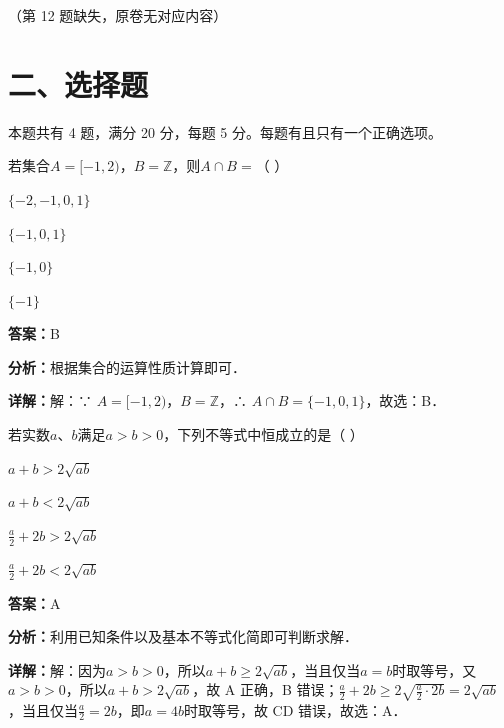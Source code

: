 \begin{question}[points=5]
（第 12 题缺失，原卷无对应内容）
\fillin[{$$}]
\begin{solution}
\end{solution}
\end{question}

\section*{二、选择题}
本题共有 4 题，满分 20 分，每题 5 分。每题有且只有一个正确选项。

\begin{question}[points=5]
若集合$A=[-1,2)$，$B=\mathbb{Z}$，则$A\cap B=$（ ）
\begin{choices}
  \item $\{-2,-1,0,1\}$
  \item $\{-1,0,1\}$
  \item $\{-1,0\}$
  \item $\{-1\}$
\end{choices}
\begin{solution}
\textbf{答案：}B

\textbf{分析：}根据集合的运算性质计算即可．

\textbf{详解：}解：∵ $A=[-1,2)$，$B=\mathbb{Z}$，∴ $A\cap B=\{-1,0,1\}$，故选：B．
\end{solution}
\end{question}

\begin{question}[points=5]
若实数$a$、$b$满足$a>b>0$，下列不等式中恒成立的是（ ）
\begin{choices}
  \item $a+b>2\sqrt{ab}$
  \item $a+b<2\sqrt{ab}$
  \item $\frac{a}{2}+2b>2\sqrt{ab}$
  \item $\frac{a}{2}+2b<2\sqrt{ab}$
\end{choices}
\begin{solution}
\textbf{答案：}A

\textbf{分析：}利用已知条件以及基本不等式化简即可判断求解．

\textbf{详解：}解：因为$a>b>0$，所以$a+b\geq 2\sqrt{ab}$，当且仅当$a=b$时取等号，又$a>b>0$，所以$a+b>2\sqrt{ab}$，故 A 正确，B 错误；$\frac{a}{2}+2b\geq 2\sqrt{\frac{a}{2}\cdot 2b}=2\sqrt{ab}$，当且仅当$\frac{a}{2}=2b$，即$a=4b$时取等号，故 CD 错误，故选：A．
\end{solution}
\end{question}

